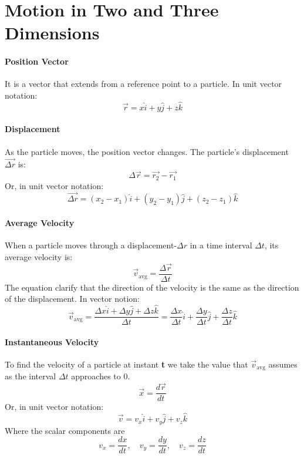 \documentclass{scrartcl}
\begin{document}
    \section{Motion in Two and Three Dimensions}
    \paragraph{Position Vector} It is a vector that extends from a reference point to a particle. In unit vector notation:
    \begin{equation}
        \vec{r} = x\hat{i}+y\hat{j}+z\hat{k}
    \end{equation}
    \paragraph{Displacement} As the particle moves, the position vector changes. The particle's displacement $\vec{\Delta{r}}$ is:
    \begin{equation}
        \Delta\vec{r}= \vec{r_2} - \vec{r_1}
    \end{equation}
    Or, in unit vector notation:
    \begin{equation}
        \vec{\Delta{r}} = (x_2 - x_1) \hat{i} + (y_2 - y_1) \hat{j} + (z_2 - z_1) \hat{k}
    \end{equation}
    \paragraph{Average Velocity} When a particle moves through a displacement-$\Delta r$ in a time interval $\Delta t$, its average velocity is: 
    \begin{equation}
        \vec{v}_{\mathrm{avg}} = \frac{\Delta\vec{r}}{\Delta t}
    \end{equation}
    The equation clarify that the direction of the velocity is the same as the direction of the displacement.
    In vector notion:
    \begin{equation}
        \vec{v}_{\mathrm{avg}} = \frac{\Delta x \hat{i} + \Delta y \hat{j} + \Delta z \hat{k}}{\Delta t} = \frac{\Delta x}{\Delta t} \hat{i} + \frac{\Delta y}{\Delta t} \hat{j} + \frac{\Delta z}{\Delta t} \hat{k}
    \end{equation}
    \paragraph{Instantaneous Velocity} To find the velocity of a particle at instant \textbf{t} we take the value that $\vec{v}_{\mathrm{avg}}$ assumes as the interval $\Delta t$ approaches to $0$.
    \begin{equation}
        \vec{x} = \frac{d\vec{r}}{dt}
    \end{equation}
    Or, in unit vector notation:
    \begin{equation}
        \vec{v} = v_x \hat{i} + v_y \hat{j} + v_z \hat{k}
    \end{equation}
    Where the scalar components are
    \begin{equation} 
        v_x= \frac{dx}{dt},\quad v_y= \frac{dy}{dt},\quad v_z= \frac{dz}{dt}
    \end{equation}
\end{document}
